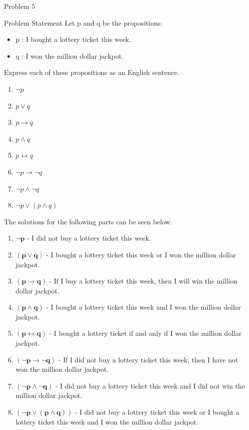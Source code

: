 \begin{problem}{Problem 5}
    \begin{statement}{Problem Statement}
        Let p and q be the propositions:

        \begin{itemize}
            \item p : I bought a lottery ticket this week.
            \item q : I won the million dollar jackpot.
        \end{itemize}

        Express each of these propositions as an English sentence.

        \begin{enumerate}[label=(\alph*)]
            \item $\neg p$
            \item $p \vee q$
            \item $p \rightarrow q$
            \item $p \wedge q$
            \item $p \leftrightarrow q$
            \item $\neg p \rightarrow \neg q$
            \item $\neg p \wedge \neg q$
            \item $\neg p \vee (p \wedge q)$
        \end{enumerate}
    \end{statement}

    \begin{Highlight}
        The solutions for the following parts can be seen below.
        \begin{enumerate}[label=(\alph*)]
            \item $\mathbf{\neg p}$ - I did not buy a lottery ticket this week.
            \item $\mathbf{(p \vee q)}$ - I bought a lottery ticket this week or I won the million dollar jackpot.
            \item $\mathbf{(p \rightarrow q)}$ - If I buy a lottery ticket this week, then I will win the million dollar jackpot.
            \item $\mathbf{(p \wedge q)}$ - I bought a lottery ticket this week and I won the million dollar jackpot.
            \item $\mathbf{(p \leftrightarrow q)}$ - I bought a lottery ticket if and only if I won the million dollar jackpot.
            \item $\mathbf{(\neg p \rightarrow \neg q)}$ - If I did not buy a lottery ticket this week, then I have not won the million dollar jackpot.
            \item $\mathbf{(\neg p \wedge \neg q)}$ - I did not buy a lottery ticket this week and I did not win the million dollar jackpot.
            \item $\mathbf{(\neg p \vee (p \wedge q))}$ - I did not buy a lottery ticket this week or I bought a lottery ticket this week and I won the million dollar jackpot.
        \end{enumerate}
    \end{Highlight}
\end{problem}


